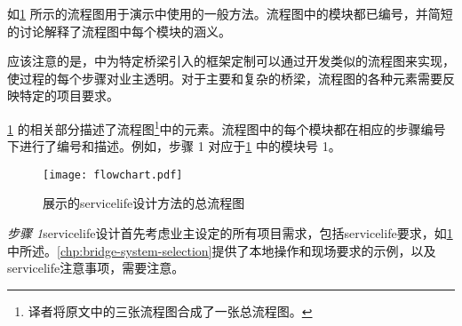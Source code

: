 如\cref{fig:general-flowchart} 所示的流程图用于演示中使用的一般方法。流程图中的模块都已编号，并简短的讨论解释了流程图中每个模块的涵义。

应该注意的是，中为特定桥梁引入的框架定制可以通过开发类似的流程图来实现，使过程的每个步骤对业主透明。对于主要和复杂的桥梁，流程图的各种元素需要反映特定的项目要求。

\cref{fig:general-flowchart} 的相关部分描述了流程图\footnote{译者将原文中的三张流程图合成了一张总流程图。}中的元素。流程图中的每个模块都在相应的步骤编号下进行了编号和描述。例如，步骤 1 对应于\cref{fig:general-flowchart} 中的模块号 1。

\begin{figure}
  \texttt{[image: flowchart.pdf]}
  \caption{展示的\gls{servicelife}设计方法的总流程图}
  \label{fig:general-flowchart}
\end{figure}

\emph{步骤 1}\quad \gls*{servicelife}设计首先考虑业主设定的所有项目需求，包括\gls{servicelife}要求，如\cref{fig:general-flowchart} 中所述。\cref{chp:bridge-system-selection}提供了本地操作和现场要求的示例，以及\gls{servicelife}注意事项，需要注意。
  
